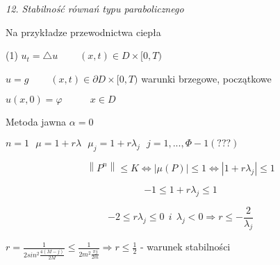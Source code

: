 \textit{12. Stabilność równań typu parabolicznego}

Na przykładze przewodnictwa ciepła

(1) $u_t = \bigtriangleup u\ \ \ \ \ \ \ \ \ \ (x,t) \in D \times [0,T)$

$u = g\ \ \ \ \ \ \ \ \ \ (x,t) \in \partial D \times [0,T)$ warunki brzegowe, początkowe

$u(x,0) = \varphi\ \ \ \ \ \ \ \ \ \ \ \ \ x \in D$

Metoda jawna $\alpha = 0$

$n = 1\ \ \ \mu = 1 + r \lambda\ \ \ \mu _j = 1 + r \lambda _j \ \ \ j = 1,...,\Phi - 1 (???)$

\[ \left \| P^n \right \| \leqslant K \Leftrightarrow \left | \mu (P) \right | \leqslant 1 \Leftrightarrow \left | 1 + r\lambda _j \right | \leqslant 1 \]

\[-1 \leqslant 1 + r \lambda _j \leqslant 1\]

\[-2 \leqslant r \lambda _j \leqslant 0\ \ i\ \ \lambda _j < 0 \Rightarrow r \leqslant - \frac{2}{\lambda _j} \]

$r = \frac{1}{2 sin^2 \frac{4(M-j)}{2M}} \leqslant \frac{1}{2m^2 \frac{\pi j}{2m}} \Rightarrow r \leqslant \frac{1}{2}$ - warunek stabilności